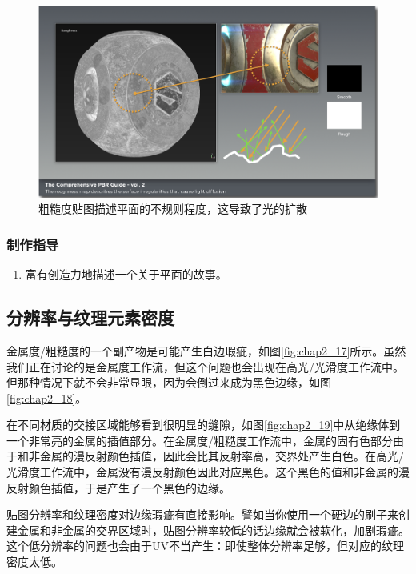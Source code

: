 \begin{figure}[ht]
    \centering
	\includegraphics[width=\textwidth]{images/chap2_16.png}
	\caption{粗糙度贴图描述平面的不规则程度，这导致了光的扩散}
    \label{fig:chap2_16}
\end{figure}

\subsubsection{制作指导}

\begin{enumerate}
\item 富有创造力地描述一个关于平面的故事。
\end{enumerate}

\subsection{分辨率与纹理元素密度}

金属度/粗糙度的一个副产物是可能产生白边瑕疵，如图\ref{fig:chap2_17}所示。虽然我们正在讨论的是金属度工作流，但这个问题也会出现在高光/光滑度工作流中。但那种情况下就不会非常显眼，因为会倒过来成为黑色边缘，如图\ref{fig:chap2_18}。

在不同材质的交接区域能够看到很明显的缝隙，如图\ref{fig:chap2_19}中从绝缘体到一个非常亮的金属的插值部分。在金属度/粗糙度工作流中，金属的固有色部分由于和非金属的漫反射颜色插值，因此会比其反射率高，交界处产生白色。在高光/光滑度工作流中，金属没有漫反射颜色因此对应黑色。这个黑色的值和非金属的漫反射颜色插值，于是产生了一个黑色的边缘。

贴图分辨率和纹理密度对边缘瑕疵有直接影响。譬如当你使用一个硬边的刷子来创建金属和非金属的交界区域时，贴图分辨率较低的话边缘就会被软化，加剧瑕疵。这个低分辨率的问题也会由于UV不当产生：即使整体分辨率足够，但对应的纹理密度太低。

